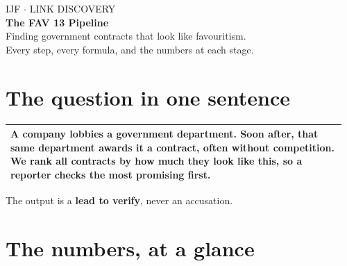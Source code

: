 \documentclass[11pt,a4paper]{article}
\makeatletter
\newenvironment{keybox}{\par\vspace{0.3em}\noindent
  \begin{tabular}{|@{\hspace{9pt}}p{0.955\linewidth}@{\hspace{9pt}}|}\hline
  \rule{0pt}{1.1em}}{\\[0.5em]\hline\end{tabular}\par\vspace{0.3em}}
\makeatother
\begin{document}
\begin{center}
{\color{slate}\ttfamily\footnotesize IJF $\cdot$ LINK DISCOVERY}\\[0.5em]
{\LARGE\bfseries The FAV 13 Pipeline}\\[0.5em]
{\color{slate}\small Finding government contracts that look like favouritism.\\
Every step, every formula, and the numbers at each stage.}
\end{center}

\vspace{0.8em}

\section*{The question in one sentence}

\begin{keybox}
A company lobbies a government department. Soon after, \textbf{that same department}
awards it a contract, often without competition. We rank all contracts by how much they
look like this, so a reporter checks the most promising first.
\end{keybox}

The output is a \textbf{lead to verify}, never an accusation.

\section*{The numbers, at a glance}
\end{document}
